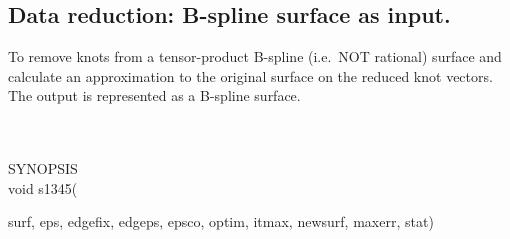 \subsection{Data reduction: B-spline surface as input.}
\begin{minipg1}
  To remove knots from a tensor-product B-spline (i.e.\ NOT rational)
  surface and calculate an approximation to the original surface on the
  reduced knot vectors.
  The output is represented as a B-spline surface.
\end{minipg1} \\ \\
SYNOPSIS\\
        \>void s1345(\begin{minipg3}
                        {\fov surf}, {\fov eps}, {\fov edgefix}, {\fov edgeps}, {\fov epsco}, {\fov optim}, {\fov itmax}, {\fov newsurf},
                        {\fov maxerr}, {\fov stat})
                        \end{minipg3}\\[0.3ex]

